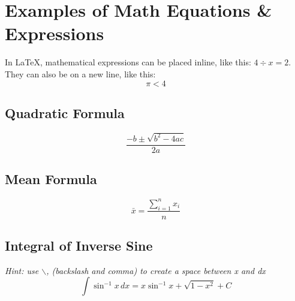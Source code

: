 \section{Examples of Math Equations \& Expressions}
In LaTeX, mathematical expressions can be placed inline, like this: \(4 \div x = 2\).
They can also be on a new line, like this:
\[\pi < 4\]
\subsection{Quadratic Formula}
\[\frac{-b\pm\sqrt{b^{2}-4ac}}{2a}\]
\subsection{Mean Formula}
\[\bar{x} = \frac{\sum_{i=1}^{n} x_i}{n}\]
\subsection{Integral of Inverse Sine}
\textit{Hint: use $\backslash$, (backslash and comma) to create a space between x and dx}
\[\int \sin^{-1}x\,dx=x\sin^{-1}x+\sqrt{1-x^{2}}+C\]
